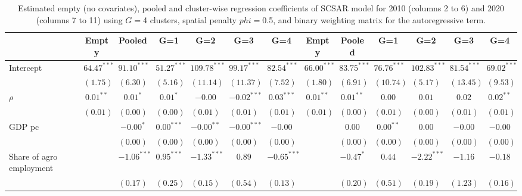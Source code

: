 
\begin{table}
\caption{Estimated empty (no covariates), pooled and cluster-wise regression coefficients of SCSAR model for 2010 (columns 2 to 6) and 2020 (columns 7 to 11) using $G=$4 clusters, spatial penalty $phi=$0.5, and binary weighting matrix for the autoregressive term.}
\begin{center}
\begin{tabular}{l c c c c c c c c c c c c}
\hline
 & Empty & Pooled & G=1 & G=2 & G=3 & G=4 & Empty & Pooled & G=1 & G=2 & G=3 & G=4 \\
\hline
Intercept                         & $64.47^{***}$ & $91.10^{***}$ & $51.27^{***}$ & $109.78^{***}$ & $99.17^{***}$ & $82.54^{***}$ & $66.00^{***}$ & $83.75^{***}$ & $76.76^{***}$ & $102.83^{***}$ & $81.54^{***}$ & $69.02^{***}$ \\
                                  & $(1.75)$      & $(6.30)$      & $(5.16)$      & $(11.14)$      & $(11.37)$     & $(7.52)$      & $(1.80)$      & $(6.91)$      & $(10.74)$     & $(5.17)$       & $(13.45)$     & $(9.53)$      \\
$\rho$                            & $0.01^{**}$   & $0.01^{*}$    & $0.01^{*}$    & $-0.00$        & $-0.02^{***}$ & $0.03^{***}$  & $0.01^{**}$   & $0.01^{**}$   & $0.00$        & $0.01$         & $0.02$        & $0.02^{**}$   \\
                                  & $(0.01)$      & $(0.00)$      & $(0.00)$      & $(0.01)$       & $(0.01)$      & $(0.01)$      & $(0.01)$      & $(0.00)$      & $(0.01)$      & $(0.00)$       & $(0.01)$      & $(0.01)$      \\
GDP pc                            &               & $-0.00^{*}$   & $0.00^{***}$  & $-0.00^{**}$   & $-0.00^{***}$ & $-0.00$       &               & $0.00$        & $0.00^{**}$   & $0.00$         & $-0.00$       & $-0.00$       \\
                                  &               & $(0.00)$      & $(0.00)$      & $(0.00)$       & $(0.00)$      & $(0.00)$      &               & $(0.00)$      & $(0.00)$      & $(0.00)$       & $(0.00)$      & $(0.00)$      \\
Share of agro employment          &               & $-1.06^{***}$ & $0.95^{***}$  & $-1.33^{***}$  & $0.89$        & $-0.65^{***}$ &               & $-0.47^{*}$   & $0.44$        & $-2.22^{***}$  & $-1.16$       & $-0.18$       \\
                                  &               & $(0.17)$      & $(0.25)$      & $(0.15)$       & $(0.54)$      & $(0.13)$      &               & $(0.20)$      & $(0.51)$      & $(0.19)$       & $(1.23)$      & $(0.16)$      \\

\end{tabular}
\end{center}
\end{table}
